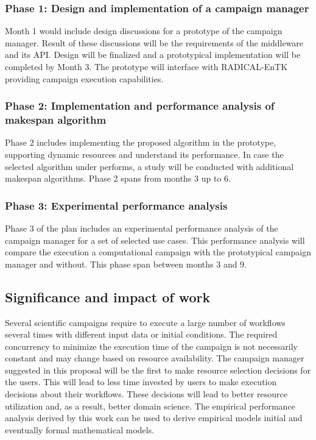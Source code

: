 \subsubsection{Phase 1: Design and implementation of a campaign manager}
Month 1 would include design discussions for a prototype of the campaign manager. 
Result of these discussions will be the requirements of the middleware and its API. 
Design will be finalized and a prototypical implementation will be completed by Month 3. 
The prototype will interface with RADICAL-EnTK providing campaign execution capabilities.

\subsubsection{Phase 2: Implementation and performance analysis of makespan algorithm}
Phase 2 includes implementing the proposed algorithm in the prototype, supporting dynamic resources and understand its performance.
In case the selected algorithm under performs, a study will be conducted with additional makespan algorithms.
Phase 2 spans from months 3 up to 6.

\subsubsection{Phase 3: Experimental performance analysis}
Phase 3 of the plan includes an experimental performance analysis of the campaign manager for a set of selected use cases.
This performance analysis will compare the execution a computational campaign with the prototypical campaign manager and without.
This phase span between months 3 and 9.

\subsection{Significance and impact of work}
Several scientific campaigns require to execute a large number of workflows several times with different input data or initial conditions. 
The required concurrency to minimize the execution time of the campaign is not necessarily constant and may change based on resource availability. 
The campaign manager suggested in this proposal will be the first to make resource selection decisions for the users. 
This will lead to less time invested by users to make execution decisions about their workflows. 
These decisions will lead to better resource utilization and, as a result, better domain science. 
The empirical performance analysis derived by this work can be used to derive empirical models initial and eventually formal mathematical models.

